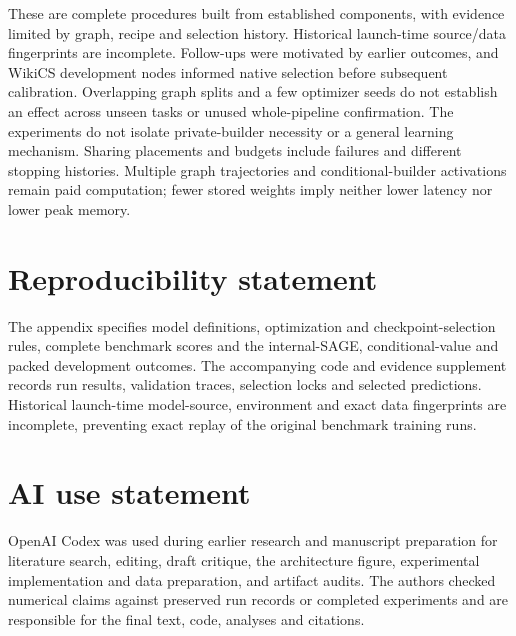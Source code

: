 \documentclass{article}
\begin{document}
These are complete procedures built from established components, with evidence limited by graph, recipe and selection history. Historical launch-time source/data fingerprints are incomplete. Follow-ups were motivated by earlier outcomes, and WikiCS development nodes informed native selection before subsequent calibration. Overlapping graph splits and a few optimizer seeds do not establish an effect across unseen tasks or unused whole-pipeline confirmation. The experiments do not isolate private-builder necessity or a general learning mechanism. Sharing placements and budgets include failures and different stopping histories. Multiple graph trajectories and conditional-builder activations remain paid computation; fewer stored weights imply neither lower latency nor lower peak memory.

\section*{Reproducibility statement}
The appendix specifies model definitions, optimization and checkpoint-selection rules, complete benchmark scores and the internal-SAGE, conditional-value and packed development outcomes. The accompanying code and evidence supplement records run results, validation traces, selection locks and selected predictions. Historical launch-time model-source, environment and exact data fingerprints are incomplete, preventing exact replay of the original benchmark training runs.

\section*{AI use statement}
OpenAI Codex was used during earlier research and manuscript preparation for literature search, editing, draft critique, the architecture figure, experimental implementation and data preparation, and artifact audits. The authors checked numerical claims against preserved run records or completed experiments and are responsible for the final text, code, analyses and citations.



\clearpage
\appendix
\renewcommand{\thesection}{A\arabic{section}}
\renewcommand{\theHsection}{appendix.\arabic{section}}
\renewcommand{\thefootnote}{\arabic{footnote}}

\end{document}
